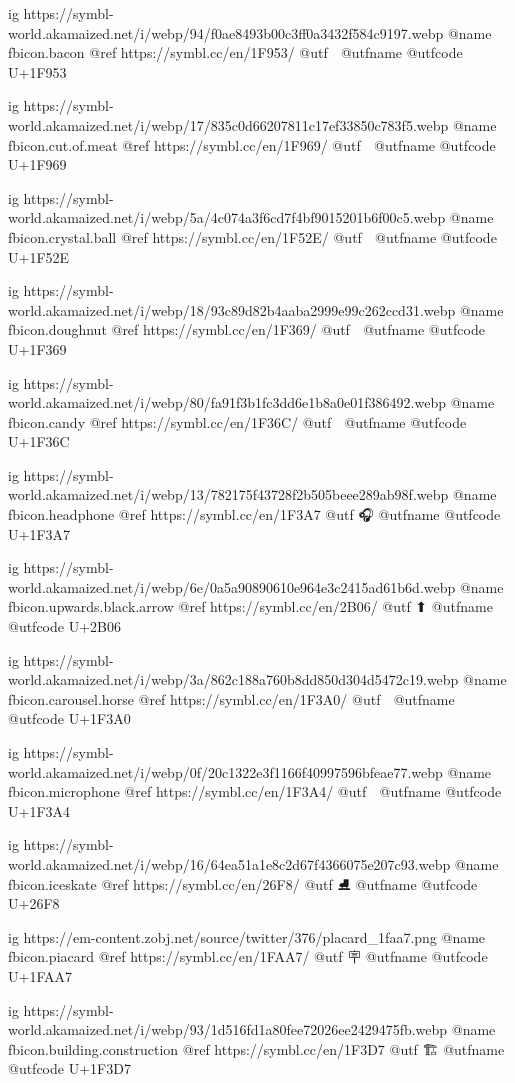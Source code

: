 	ig https://symbl-world.akamaized.net/i/webp/94/f0ae8493b00c3ff0a3432f584c9197.webp
	@name fbicon.bacon
	@ref https://symbl.cc/en/1F953/
	@utf 🥓
	@utfname
	@utfcode U+1F953

	ig https://symbl-world.akamaized.net/i/webp/17/835c0d66207811c17ef33850c783f5.webp
	@name fbicon.cut.of.meat
	@ref https://symbl.cc/en/1F969/
	@utf 🥩
	@utfname
	@utfcode U+1F969

	ig https://symbl-world.akamaized.net/i/webp/5a/4c074a3f6cd7f4bf9015201b6f00c5.webp
	@name fbicon.crystal.ball
	@ref https://symbl.cc/en/1F52E/
	@utf 🔮
	@utfname
	@utfcode U+1F52E

	ig https://symbl-world.akamaized.net/i/webp/18/93c89d82b4aaba2999e99c262ccd31.webp
	@name fbicon.doughnut
	@ref https://symbl.cc/en/1F369/
	@utf 🍩
	@utfname
	@utfcode U+1F369

	ig https://symbl-world.akamaized.net/i/webp/80/fa91f3b1fc3dd6e1b8a0e01f386492.webp
	@name fbicon.candy
	@ref https://symbl.cc/en/1F36C/
	@utf 🍬
	@utfname
	@utfcode U+1F36C

	ig https://symbl-world.akamaized.net/i/webp/13/782175f43728f2b505beee289ab98f.webp
	@name fbicon.headphone
	@ref https://symbl.cc/en/1F3A7
	@utf 🎧
	@utfname
	@utfcode U+1F3A7

	ig https://symbl-world.akamaized.net/i/webp/6e/0a5a90890610e964e3c2415ad61b6d.webp
	@name fbicon.upwards.black.arrow
	@ref https://symbl.cc/en/2B06/
	@utf ⬆
	@utfname
	@utfcode U+2B06

	ig https://symbl-world.akamaized.net/i/webp/3a/862c188a760b8dd850d304d5472c19.webp
	@name fbicon.carousel.horse
	@ref https://symbl.cc/en/1F3A0/
	@utf 🎠
	@utfname
	@utfcode U+1F3A0

	ig https://symbl-world.akamaized.net/i/webp/0f/20c1322e3f1166f40997596bfeae77.webp
	@name fbicon.microphone
	@ref https://symbl.cc/en/1F3A4/
	@utf 🎤
	@utfname
	@utfcode U+1F3A4

	ig https://symbl-world.akamaized.net/i/webp/16/64ea51a1e8c2d67f4366075e207c93.webp
	@name fbicon.iceskate
	@ref https://symbl.cc/en/26F8/
	@utf ⛸
	@utfname 
	@utfcode U+26F8

	ig https://em-content.zobj.net/source/twitter/376/placard_1faa7.png
	@name fbicon.piacard
	@ref https://symbl.cc/en/1FAA7/
	@utf 🪧
	@utfname
	@utfcode U+1FAA7

	ig https://symbl-world.akamaized.net/i/webp/93/1d516fd1a80fee72026ee2429475fb.webp
	@name fbicon.building.construction
	@ref https://symbl.cc/en/1F3D7
	@utf 🏗
	@utfname
	@utfcode U+1F3D7




\fi

